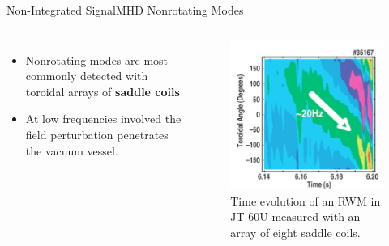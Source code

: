 \documentclass{beamer}
\begin{document}
\begin{frame}{Non-Integrated Signal}{MHD Nonrotating Modes }
	\begin{columns}
		\begin{itemize}
			\item Nonrotating modes are most commonly detected with toroidal arrays of \textbf{ saddle coils}
			\item At low frequencies involved the field perturbation penetrates the vacuum vessel.
		\end{itemize}
		\begin{figure}[ht]
			\begin{center}
				\includegraphics[width=0.6 \columnwidth]{RWM.png}
				\caption{\small  Time evolution of an RWM in JT-60U measured with an array of eight saddle coils.}
			\end{center}
		\end{figure}
 	 \end{columns}
\end{frame}

%


\end{document}
